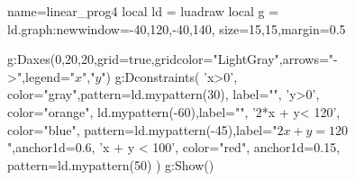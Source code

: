 \documentclass[12pt,a4paper]{article}
\begin{document}
\begin{figure}[H]
  \centering
 \begin{luadraw}{name=linear_prog4}
local ld = luadraw
local g = ld.graph:new{window={-40,120,-40,140}, size={15,15},margin=0.5}

g:Daxes({0,20,20},{grid=true,gridcolor="LightGray",arrows="->",legend={"$x$","$y$"}})
g:Dconstraints(
    'x>0', {color="gray",pattern=ld.mypattern(30), label=""},
    'y>0', {color="orange", ld.mypattern(-60),label=""},
    '2*x + y< 120', {color="blue", pattern=ld.mypattern(-45),label="$2x+y=120$",anchor1d=0.6},
    'x + y  < 100', {color="red", anchor1d=0.15, pattern=ld.mypattern(50)}
    )
g:Show()
\end{luadraw}
  \caption{}
\end{figure}
\end{document}
